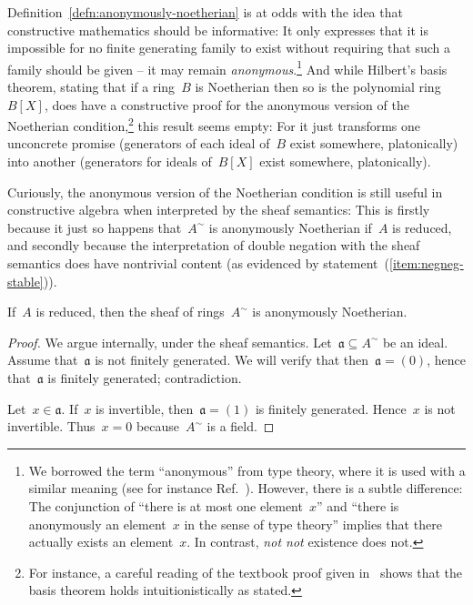 \documentclass{ws-rv9x6}
\newcommand{\aaa}{\mathfrak{a}}
\renewcommand{\_}{\mathpunct{.}}
\newcommand{\?}{\,{:}\,}
\newcommand{\notnot}{\emph{not not}\xspace}
\begin{document}
Definition~\ref{defn:anonymously-noetherian} is at odds with the idea that constructive mathematics should
be informative: It only expresses that it is impossible for no finite
generating family to exist without requiring that such a family should be given
-- it may remain \emph{anonymous}.\footnote{We borrowed the term ``anonymous''
from type theory, where it is used with a similar meaning (see for instance
Ref.~). However, there is a
subtle difference: The conjunction of ``there is at most one element~$x$'' and
``there is anonymously an element~$x$ in the sense of type theory'' implies
that there actually exists an element~$x$. In contrast, \notnot existence does
not.} And while Hilbert's basis theorem, stating that if a ring~$B$ is
Noetherian then so is the polynomial ring~$B[X]$, does have a constructive
proof for the anonymous version of the Noetherian condition,\footnote{For
instance, a careful reading of the textbook proof given
in~\cite[Theorem~7.5]{atiyah-macdonald:commutative-algebra} shows that the
basis theorem holds intuitionistically as stated.} this result seems empty: For
it just transforms one unconcrete promise (generators of each ideal of~$B$
exist somewhere, platonically) into another (generators for ideals of~$B[X]$
exist somewhere, platonically).

Curiously, the anonymous version of the Noetherian condition is still useful in
constructive algebra when interpreted by the sheaf semantics: This is firstly
because it just so happens that~$A^\sim$ is anonymously Noetherian if~$A$ is reduced,
and secondly because the interpretation of double negation with the sheaf
semantics does have nontrivial content (as evidenced by
statement~(\ref{item:negneg-stable})).

\begin{proposition}\label{prop:anon-noeth}
If~$A$ is reduced, then the sheaf of rings~$A^\sim$ is anonymously
Noetherian.\end{proposition}

\begin{proof}We argue internally, under the sheaf semantics. Let~$\aaa \subseteq A^\sim$ be an ideal.
Assume that~$\aaa$ is not finitely generated. We will verify that then~$\aaa =
(0)$, hence that~$\aaa$ is finitely generated; contradiction.

Let~$x \in \aaa$. If~$x$ is invertible, then~$\aaa = (1)$ is finitely
generated. Hence~$x$ is not invertible. Thus~$x = 0$ because~$A^\sim$ is a
field.
\end{proof}
\end{document}

